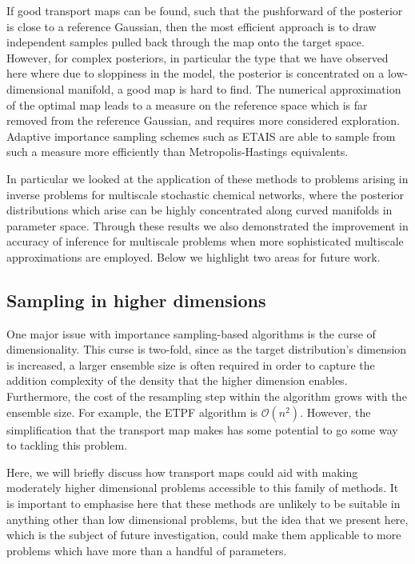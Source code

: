 \documentclass[final]{siamltex}
\newcommand{\edit}[1]{{\color{red} #1}}
\begin{document}
\edit{If good transport maps can be found, such that the pushforward
  of the posterior is close to a reference Gaussian, then the most
  efficient approach is to draw independent samples pulled back
  through the map onto the target space. However, for complex
  posteriors, in particular the type that we have observed here where
  due to sloppiness in the model, the posterior is concentrated on a
  low-dimensional manifold, a good map is hard to find. The numerical
  approximation of the optimal map leads to a measure on the reference
  space which is far removed from the reference Gaussian, and requires
  more considered exploration. Adaptive importance sampling schemes
  such as ETAIS are able to sample from such a measure
  more efficiently than Metropolis-Hastings equivalents.}

In particular we looked at the application of these methods to
problems arising in inverse problems for multiscale stochastic
chemical networks, where the posterior distributions which arise can
be highly concentrated along curved manifolds in parameter
space. Through these results we also demonstrated the improvement in
accuracy of inference for multiscale problems when more sophisticated
multiscale approximations are employed. Below we highlight two areas for future work.

\subsection{Sampling in higher
  dimensions}\label{sec:TETAIS_higher_dim}

One major issue with importance sampling-based algorithms is the curse of
dimensionality. This curse is two-fold, since as the target
distribution's dimension is increased, a larger ensemble size is often
required in order to capture the addition complexity of the density
that the higher dimension enables. Furthermore, the cost of the
resampling step within the algorithm grows with the ensemble size. For
example, the ETPF algorithm is $\mathcal{O}(n^2)$. However, the
simplification that the transport map makes has some potential to go
some way to tackling this problem.

Here, we will briefly discuss how transport maps could aid
with making moderately higher dimensional problems accessible to this
family of methods. It is important to emphasise here that these
methods are unlikely to be suitable in anything other than low
dimensional problems, but the idea that we present here, which is the
subject of future investigation, could make them applicable to more
problems which have more than a handful of parameters.
\end{document}
